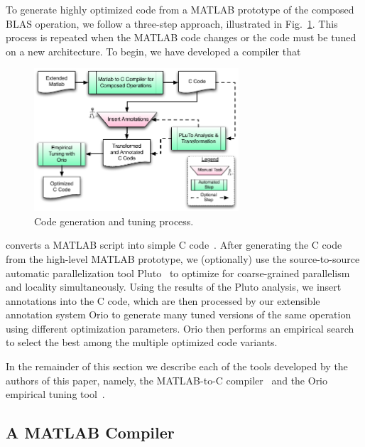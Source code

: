 \documentclass[runningheads]{llncs}
\begin{document}
To generate highly optimized code from a MATLAB prototype of the composed
BLAS operation, we follow a three-step approach, illustrated in
Fig.~\ref{fig:process}.  This process is repeated when the MATLAB code changes
or the code must be tuned on a new architecture.
To begin, we have developed a compiler that
%
\begin{figure}
\vspace{-.2in}
\centering
\includegraphics[width=3in]{figures/process.pdf}
\vspace{-.15in}
\caption{Code generation and tuning process.}
\label{fig:process}
\vspace{-.1in}
\end{figure}
%
converts a MATLAB script into simple C code~\cite{Siek}.  After generating
the C code from the high-level MATLAB prototype, we (optionally) use 
the source-to-source automatic parallelization tool Pluto~\cite{Pluto} %
to optimize for coarse-grained parallelism and locality simultaneously. Using
the results of the Pluto analysis, we insert annotations into the C code,
which are then processed by our extensible annotation system Orio to generate
many tuned versions of the same operation using different optimization
parameters. Orio then performs an empirical search to select the best among
the multiple optimized code variants.


In the remainder of this section we describe each of the tools developed by
the authors of this paper, namely, the MATLAB-to-C compiler~\cite{Siek} and the Orio
empirical tuning tool~\cite{Norris:2007,Hartono:IPDPS09}.

\subsection{A MATLAB Compiler}
\label{sec:matlab}
\end{document}
